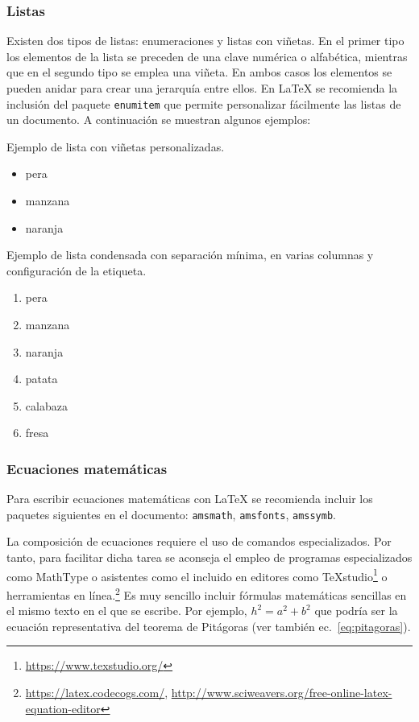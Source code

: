 \subsubsection{Listas}
\label{sec:ejListas}
Existen dos tipos de listas: enumeraciones y listas con viñetas. En el primer tipo los elementos de la lista se preceden de una clave numérica o alfabética, mientras que en el segundo tipo se emplea una viñeta. En ambos casos los elementos se pueden anidar para crear una jerarquía entre ellos. En \LaTeX{} se recomienda la inclusión del paquete \texttt{enumitem} que permite personalizar fácilmente las listas de un documento. A continuación se muestran algunos ejemplos:


\noindent Ejemplo de lista con viñetas personalizadas. 
\begin{itemize}
	\item pera
	\item[\ding{43}] manzana %
	\item[\faAward] naranja
\end{itemize}


\noindent Ejemplo de lista condensada con separación mínima, en varias columnas y configuración de la etiqueta.
\begin{multicols}{2} %
	\begin{enumerate}[(1),noitemsep]
		\item pera
		\item manzana
		\item naranja
		\item patata
		\item calabaza
		\item fresa
	\end{enumerate}
\end{multicols}





\subsubsection{Ecuaciones matemáticas}
Para escribir ecuaciones matemáticas con \LaTeX{} se recomienda incluir los paquetes siguientes en el documento: \texttt{amsmath}, \texttt{amsfonts}, \texttt{amssymb}. 

La composición de ecuaciones requiere el uso de comandos especializados. Por tanto, para facilitar dicha tarea se aconseja el empleo de programas especializados como \textsf{MathType} o asistentes como el incluido en editores como \TeX studio\footnote{\url{https://www.texstudio.org/}} o herramientas en línea.\footnote{\url{https://latex.codecogs.com/},  \url{http://www.sciweavers.org/free-online-latex-equation-editor}} Es muy sencillo incluir fórmulas matemáticas sencillas en el mismo texto en el que se escribe. Por ejemplo, $h^{2}=a^{2}+b^{2}$ que podría ser la ecuación representativa del teorema de Pitágoras (ver también ec.~\ref{eq:pitagoras}).

